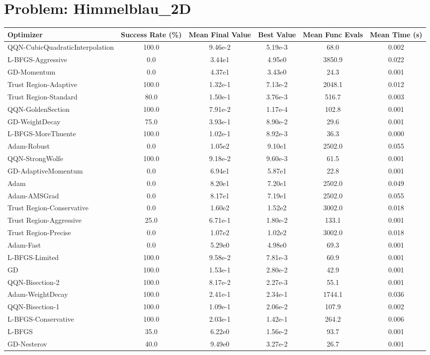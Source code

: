 \documentclass{article}
\begin{document}
\section{Problem: Himmelblau\_2D}
\begin{longtable}{p{3cm}*{5}{c}}
\toprule
\textbf{Optimizer} & \textbf{Success Rate (\%)} & \textbf{Mean Final Value} & \textbf{Best Value} & \textbf{Mean Func Evals} & \textbf{Mean Time (s)} \\
\midrule
QQN-CubicQuadraticInterpolation & 100.0 & 9.46e-2 & 5.19e-3 & 68.0 & 0.002 \\
L-BFGS-Aggressive & 0.0 & 3.44e1 & 4.95e0 & 3850.9 & 0.022 \\
GD-Momentum & 0.0 & 4.37e1 & 3.43e0 & 24.3 & 0.001 \\
Trust Region-Adaptive & 100.0 & 1.32e-1 & 7.13e-2 & 2048.1 & 0.012 \\
Trust Region-Standard & 80.0 & 1.50e-1 & 3.76e-3 & 516.7 & 0.003 \\
QQN-GoldenSection & 100.0 & 7.91e-2 & 1.17e-4 & 102.8 & 0.001 \\
GD-WeightDecay & 75.0 & 3.93e-1 & 8.90e-2 & 29.6 & 0.001 \\
L-BFGS-MoreThuente & 100.0 & 1.02e-1 & 8.92e-3 & 36.3 & 0.000 \\
Adam-Robust & 0.0 & 1.05e2 & 9.10e1 & 2502.0 & 0.055 \\
QQN-StrongWolfe & 100.0 & 9.18e-2 & 9.60e-3 & 61.5 & 0.001 \\
GD-AdaptiveMomentum & 0.0 & 6.94e1 & 5.87e1 & 22.8 & 0.001 \\
Adam & 0.0 & 8.20e1 & 7.20e1 & 2502.0 & 0.049 \\
Adam-AMSGrad & 0.0 & 8.17e1 & 7.19e1 & 2502.0 & 0.055 \\
Trust Region-Conservative & 0.0 & 1.60e2 & 1.52e2 & 3002.0 & 0.018 \\
Trust Region-Aggressive & 25.0 & 6.71e-1 & 1.80e-2 & 133.1 & 0.001 \\
Trust Region-Precise & 0.0 & 1.07e2 & 1.02e2 & 3002.0 & 0.018 \\
Adam-Fast & 0.0 & 5.29e0 & 4.98e0 & 69.3 & 0.001 \\
L-BFGS-Limited & 100.0 & 9.58e-2 & 7.81e-3 & 60.9 & 0.001 \\
GD & 100.0 & 1.53e-1 & 2.80e-2 & 42.9 & 0.001 \\
QQN-Bisection-2 & 100.0 & 8.17e-2 & 2.27e-3 & 55.1 & 0.001 \\
Adam-WeightDecay & 100.0 & 2.41e-1 & 2.34e-1 & 1744.1 & 0.036 \\
QQN-Bisection-1 & 100.0 & 1.09e-1 & 2.06e-2 & 107.9 & 0.002 \\
L-BFGS-Conservative & 100.0 & 2.03e-1 & 1.42e-1 & 264.2 & 0.006 \\
L-BFGS & 35.0 & 6.22e0 & 1.56e-2 & 93.7 & 0.001 \\
GD-Nesterov & 40.0 & 9.49e0 & 3.27e-2 & 26.7 & 0.001 \\
\bottomrule
\end{longtable}
\end{document}
